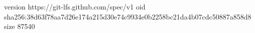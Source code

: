 version https://git-lfs.github.com/spec/v1
oid sha256:38d63f78aa7d26e174a215d30e74c9934e0b2258bc21da4b07cdc50887a858d8
size 87540

